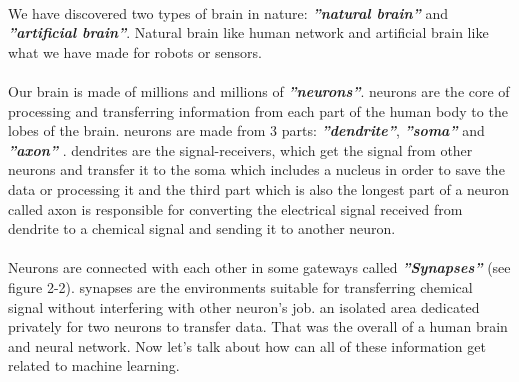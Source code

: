 \documentclass[12pt , a4paper]{article}
\begin{document}
\paragraph{} We have discovered two types of brain in nature: \textbf {\textit{''natural brain''}}  and \textbf {\textit{''artificial brain''}}.
Natural brain like human network and artificial brain like what we have made for robots or sensors. \\
\paragraph{} Our brain is made of millions and millions of \textbf {\textit{''neurons''}}. neurons are the core of processing and transferring information from each part of the human body to the lobes of the brain. neurons are made from 3 parts: \textbf {\textit{''dendrite''}}, \textbf {\textit{''soma''}} and \textbf {\textit{''axon''}} . dendrites are the signal-receivers, which get the signal from other neurons and transfer it to the soma which includes a nucleus in order to save the data or processing it and the third part which is also the longest part of a neuron called axon is responsible for converting the electrical signal received from dendrite to a chemical signal and sending it to another neuron.  \\
\paragraph{} Neurons are connected with each other in some gateways called \textbf {\textit{''Synapses''}} (see figure 2-2). synapses are the environments suitable for transferring chemical signal without interfering with other neuron’s job. an isolated area dedicated privately for two neurons to transfer data. 
That was the overall of a human brain and neural network. 
Now let’s talk about how can all of these information get related to machine learning. \\
\end{document}
